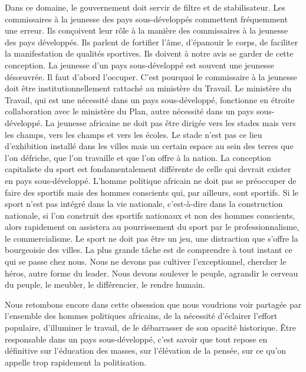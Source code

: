 \documentclass[french,twoside]{book} %
\begin{document}
\noindent Dans ce domaine, le gouvernement doit servir de filtre et de stabilisateur. Les commissaires à la jeunesse des pays sous-développés commettent fréquemment une erreur. Ils conçoivent leur rôle à la manière des commissaires à la jeunesse des pays développés. Ils parlent de fortifier l’âme, d’épanouir le corps, de faciliter la manifestation de qualités sportives. Ils doivent à notre avis se garder de cette conception. La jeunesse d’un pays sous-développé est souvent une jeunesse désœuvrée. Il faut d’abord l’occuper. C’est pourquoi le commissaire à la jeunesse doit être institutionnellement rattaché au ministère du Travail. Le ministère du Travail, qui est une nécessité dans un pays sous-développé, fonctionne en étroite collaboration avec le ministère du Plan, autre nécessité dans un pays sous-développé. La jeunesse africaine ne doit pas être dirigée vers les stades mais vers les champs, vers les champs et vers les écoles. Le stade n’est pas ce lieu d’exhibition installé dans les villes mais un certain espace au sein des terres que l’on défriche, que l’on travaille et que l’on offre à la nation. La conception capitaliste du sport est fondamentalement différente de celle qui devrait exister en pays sous-développé. L’homme politique africain ne doit pas se préoccuper de faire des sportifs mais des hommes conscients qui, par ailleurs, sont sportifs. Si le sport n’est pas intégré dans la vie nationale, c’est-à-dire dans la construction nationale, si l’on construit des sportifs nationaux et non des hommes conscients, alors rapidement on assistera au pourrissement du   sport par le professionnalisme, le commercialisme. Le sport ne doit pas être un jeu, une distraction que s’offre la bourgeoisie des villes. La plus grande tâche est de comprendre à tout instant ce qui se passe chez nous. Nous ne devons pas cultiver l’exceptionnel, chercher le héros, autre forme du leader. Nous devons soulever le peuple, agrandir le cerveau du peuple, le meubler, le différencier, le rendre humain.\par
\bigbreak
\noindent Nous retombons encore dans cette obsession que nous voudrions voir partagée par l’ensemble des hommes politiques africains, de la nécessité d’éclairer l’effort populaire, d’illuminer le travail, de le débarrasser de son opacité historique. Être responsable dans un pays sous-développé, c’est savoir que tout repose en définitive sur l’éducation des masses, sur l’élévation de la pensée, sur ce qu’on appelle trop rapidement la politisation.\par
\end{document}
